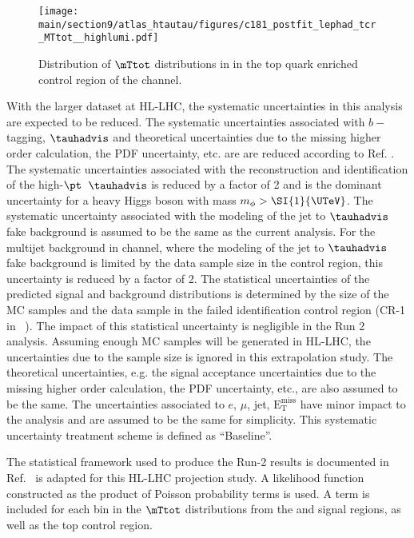 \begin{figure}[!ht]
    \centering
        \qquad
        \texttt{[image: \\main/section9/atlas\_htautau/figures/c181\_postfit\_lephad\_tcr\_MTtot\_\_highlumi.pdf]}
        \caption{Distribution of $\mTtot$ distributions in in the top quark enriched control region of the \lephad channel.}
    \label{fig:mTtotDistributionsCR}
\end{figure}

With the larger dataset at HL-LHC, the systematic uncertainties in this analysis are expected to be reduced.
The systematic uncertainties associated with $b-$tagging, $\tauhadvis$ and theoretical uncertainties due to 
the missing higher order calculation, the PDF uncertainty, etc. are are reduced according to 
Ref. \cite{LHATLASdetectorSystScale}. The systematic uncertainties associated with the reconstruction 
and identification of the high-$\pt$~$\tauhadvis$ is reduced by a factor of 2 and is the dominant 
uncertainty for a heavy Higgs boson with mass $m_{\phi} >\SI{1}{\UTeV}$. The systematic uncertainty associated 
with the modeling of the jet to $\tauhadvis$ fake background is assumed to be the same as the current analysis.
For the multijet background in \hadhad channel, where the modeling of the jet to $\tauhadvis$ fake background 
is limited by the data sample size in the control region, this uncertainty is reduced by a factor of 2. 
The statistical uncertainties of the predicted signal and background distributions is determined 
by the size of the MC samples and the data sample in the failed \tauhadvis identification control region 
(CR-1 in ~\cite{ATLASRun2Ditau}). The impact of this statistical uncertainty is negligible in the Run 2 analysis. 
Assuming enough MC samples will be generated in HL-LHC, the uncertainties due to 
the sample size is ignored in this extrapolation study. The theoretical uncertainties, e.g. the signal acceptance 
uncertainties due to the missing higher order calculation, the PDF uncertainty, etc., are also assumed to be 
the same. The uncertainties associated to $e$, $\mu$, jet, $\mathrm{E^{miss}_T}$ have minor impact to the analysis 
and are assumed to be the same for simplicity. This systematic uncertainty treatment scheme is defined as ``Baseline''. 

The statistical framework used to produce the Run-2 results is documented in Ref.~\cite{ATLASRun2Ditau} is adapted 
for this HL-LHC projection study. A likelihood function constructed as the product of Poisson probability terms 
is used. A term is included for each bin in the $\mTtot$ distributions from the \lephad and \hadhad signal regions, 
as well as the top control region. 

